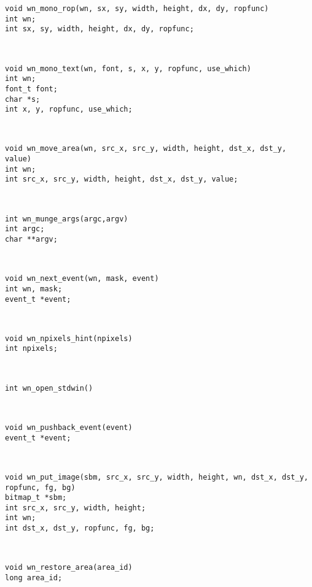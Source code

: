 \parbox[t]{5in}{\tt void wn\_mono\_rop(wn, sx, sy, width, height, dx, dy, ropfunc)\\int wn;\\int sx, sy, width, height, dx, dy, ropfunc;}\> \pageref{wn_mono_rop}\\[0.1in]
\parbox[t]{5in}{\tt void wn\_mono\_text(wn, font, s, x, y, ropfunc, use\_which)\\int wn;\\font\_t font;\\char *s;\\int x, y, ropfunc, use\_which;}\> \pageref{wn_mono_text}\\[0.1in]
\parbox[t]{5in}{\tt void wn\_move\_area(wn, src\_x, src\_y, width, height, dst\_x, dst\_y, value)\\int wn;\\int src\_x, src\_y, width, height, dst\_x, dst\_y, value;}\> \pageref{wn_move_area}\\[0.1in]
\parbox[t]{5in}{\tt int wn\_munge\_args(argc,argv)\\int argc;\\char **argv;}\> \pageref{wn_munge_args}\\[0.1in]
\parbox[t]{5in}{\tt void wn\_next\_event(wn, mask, event)\\int wn, mask;\\event\_t *event;}\> \pageref{wn_next_event}\\[0.1in]
\parbox[t]{5in}{\tt void wn\_npixels\_hint(npixels)\\int npixels;}\> \pageref{wn_npixels_hint}\\[0.1in]
\parbox[t]{5in}{\tt int wn\_open\_stdwin()}\> \pageref{wn_open_stdwin}\\[0.1in]
\parbox[t]{5in}{\tt void wn\_pushback\_event(event)\\event\_t *event;}\> \pageref{wn_pushback_event}\\[0.1in]
\parbox[t]{5in}{\tt void wn\_put\_image(sbm, src\_x, src\_y, width, height, wn, dst\_x, dst\_y, ropfunc, fg, bg)\\bitmap\_t *sbm;\\int src\_x, src\_y, width, height;\\int wn;\\int dst\_x, dst\_y, ropfunc, fg, bg;}\> \pageref{wn_put_image}\\[0.1in]
\parbox[t]{5in}{\tt void wn\_restore\_area(area\_id)\\long area\_id;}\> \pageref{wn_restore_area}\\[0.1in]
